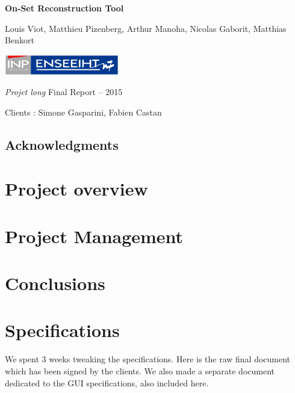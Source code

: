 \documentclass[a4paper]{report}
\title{\mytitle}
\author{\myauthor}
\date{From January, 19\up{th} to March, 13\up{th}}
\def\mytitle{On-Set Reconstruction Tool}
\def\myauthor{Louis Viot, Matthieu Pizenberg, Arthur Manoha, Nicolas
  Gaborit, Matthias Benkort}
\begin{document}
\begin{titlepage}
\centering

\null
\vfill

{\Huge\sffamily\bfseries\mytitle\par}
\vspace{1cm}
{\Large\myauthor\par}

\vfill
\vfill

\includegraphics[width=5cm]{img/inpn7.pdf}

\vfill

{\Large \emph{Projet long} Final Report -- 2015\par%
  Clients : Simone Gasparini, Fabien Castan\par}


\end{titlepage}

\tableofcontents

\newpage

\thispagestyle{empty}
\null
\vfill

\section*{Acknowledgments}


\chapter{Project overview}


\chapter{Project Management}


\chapter{Conclusions}


\appendix
\chapter{Specifications}
We spent 3 weeks tweaking the specifications. Here is the raw final
document which has been signed by the clients. We also made a separate
document dedicated to the GUI specifications, also included here.
\end{document}

